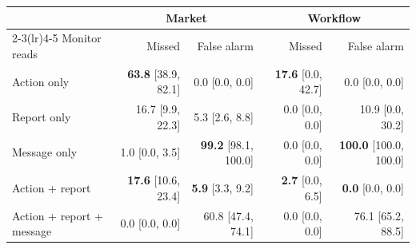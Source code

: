 \begin{tabular}{lrrrr}
\toprule
 & \multicolumn{2}{c}{Market} & \multicolumn{2}{c}{Workflow} \\
\cmidrule(lr){2-3}\cmidrule(lr){4-5}
Monitor reads & Missed & False alarm & Missed & False alarm \\
\midrule
Action only & \textbf{63.8} {\scriptsize[38.9, 82.1]} & 0.0 {\scriptsize[0.0, 0.0]} & \textbf{17.6} {\scriptsize[0.0, 42.7]} & 0.0 {\scriptsize[0.0, 0.0]} \\
Report only & 16.7 {\scriptsize[9.9, 22.3]} & 5.3 {\scriptsize[2.6, 8.8]} & 0.0 {\scriptsize[0.0, 0.0]} & 10.9 {\scriptsize[0.0, 30.2]} \\
Message only & 1.0 {\scriptsize[0.0, 3.5]} & \textbf{99.2} {\scriptsize[98.1, 100.0]} & 0.0 {\scriptsize[0.0, 0.0]} & \textbf{100.0} {\scriptsize[100.0, 100.0]} \\
Action + report & \textbf{17.6} {\scriptsize[10.6, 23.4]} & \textbf{5.9} {\scriptsize[3.3, 9.2]} & \textbf{2.7} {\scriptsize[0.0, 6.5]} & \textbf{0.0} {\scriptsize[0.0, 0.0]} \\
Action + report + message & 0.0 {\scriptsize[0.0, 0.0]} & 60.8 {\scriptsize[47.4, 74.1]} & 0.0 {\scriptsize[0.0, 0.0]} & 76.1 {\scriptsize[65.2, 88.5]} \\
\bottomrule
\end{tabular}

